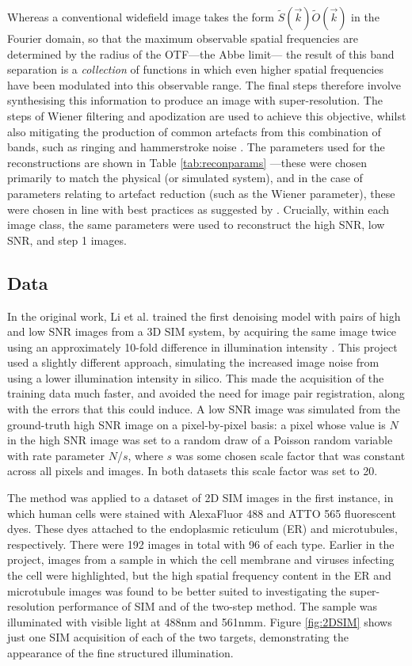 \documentclass[12pt]{article}
\begin{document}
Whereas a conventional widefield image takes the form $\tilde{S}(\vec{k})\tilde{O}(\vec{k})$ in the Fourier domain,
so that the maximum observable spatial frequencies are determined by the radius of the OTF---the Abbe limit---
the result of this band separation is a \textit{collection} of functions in which even higher spatial frequencies have been modulated into this observable range.
The final steps therefore involve synthesising this information to produce an image with super-resolution.
The steps of Wiener filtering and apodization are used to achieve this objective,
whilst also mitigating the production of common artefacts from this combination of bands,
such as ringing and hammerstroke noise \cite{params}.
The parameters used for the reconstructions are shown in Table \ref{tab:reconparams}
---these were chosen primarily to match the physical (or simulated system),
and in the case of parameters relating to artefact reduction (such as the Wiener parameter),
these were chosen in line with best practices as suggested by \cite{params}.
Crucially, within each image class, the same parameters were used to reconstruct the high SNR, low SNR, and step 1 images.

\subsection{Data}

In the original work, Li et al. trained the first denoising model with pairs of high and low SNR images from a 3D SIM system,
by acquiring the same image twice using an approximately 10-fold difference in illumination intensity \cite{keypaper}.
This project used a slightly different approach,
simulating the increased image noise from using a lower illumination intensity in silico.
This made the acquisition of the training data much faster,
and avoided the need for image pair registration, along with the errors that this could induce.
A low SNR image was simulated from the ground-truth high SNR image on a pixel-by-pixel basis:
a pixel whose value is $N$ in the high SNR image was set to a random draw of a Poisson random variable with rate parameter $N$/$s$,
where $s$ was some chosen scale factor that was constant across all pixels and images.
In both datasets this scale factor was set to 20.

The method was applied to a dataset of 2D SIM images in the first instance,
in which human cells were stained with AlexaFluor 488 and ATTO 565 fluorescent dyes.
These dyes attached to the endoplasmic reticulum (ER) and microtubules, respectively.
There were 192 images in total with 96 of each type.
Earlier in the project, images from a sample in which the cell membrane and viruses infecting the cell were highlighted,
but the high spatial frequency content in the ER and microtubule images was found to be better suited to investigating the super-resolution performance of SIM and of the two-step method.
The sample was illuminated with visible light at 488nm and 561nmm.
Figure \ref{fig:2DSIM} shows just one SIM acquisition of each of the two targets,
demonstrating the appearance of the fine structured illumination.
\end{document}
